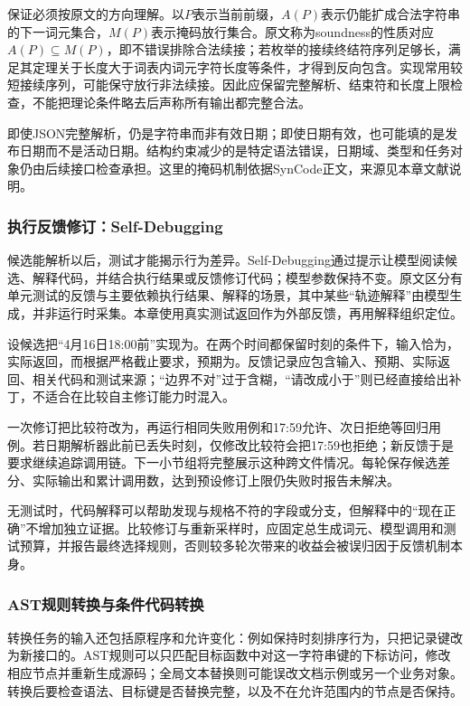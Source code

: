保证必须按原文的方向理解。以$P$表示当前前缀，$A(P)$表示仍能扩成合法字符串的下一词元集合，$M(P)$表示掩码放行集合。原文称为soundness的性质对应$A(P)\subseteq M(P)$，即不错误排除合法续接；若枚举的接续终结符序列足够长，满足其定理关于长度大于词表内词元字符长度等条件，才得到反向包含。实现常用较短接续序列，可能保守放行非法续接。因此应保留完整解析、结束符和长度上限检查，不能把理论条件略去后声称所有输出都完整合法。

即使JSON完整解析，仍是字符串而非有效日期；即使日期有效，也可能填的是发布日期而不是活动日期。结构约束减少的是特定语法错误，日期域、类型和任务对象仍由后续接口检查承担。这里的掩码机制依据SynCode正文，来源见本章文献说明。

\subsubsection{执行反馈修订：Self-Debugging}
\label{sec:nlp-execution-self-debugging}

候选能解析以后，测试才能揭示行为差异。Self-Debugging通过提示让模型阅读候选、解释代码，并结合执行结果或反馈修订代码；模型参数保持不变。原文区分有单元测试的反馈与主要依赖执行结果、解释的场景，其中某些“轨迹解释”由模型生成，并非运行时采集。本章使用真实测试返回作为外部反馈，再用解释组织定位。

设候选把“4月16日18:00前”实现为。在两个时间都保留时刻的条件下，输入恰为，实际返回，而根据严格截止要求，预期为。反馈记录应包含输入、预期、实际返回、相关代码和测试来源；“边界不对”过于含糊，“请改成小于”则已经直接给出补丁，不适合在比较自主修订能力时混入。

一次修订把比较符改为\code{<}，再运行相同失败用例和17:59允许、次日拒绝等回归用例。若日期解析器此前已丢失时刻，仅修改比较符会把17:59也拒绝；新反馈于是要求继续追踪调用链。下一小节组将完整展示这种跨文件情况。每轮保存候选差分、实际输出和累计调用数，达到预设修订上限仍失败时报告未解决。

无测试时，代码解释可以帮助发现与规格不符的字段或分支，但解释中的“现在正确”不增加独立证据。比较修订与重新采样时，应固定总生成词元、模型调用和测试预算，并报告最终选择规则，否则较多轮次带来的收益会被误归因于反馈机制本身。

\subsubsection{AST规则转换与条件代码转换}
\label{sec:nlp-execution-transformation}

转换任务的输入还包括原程序和允许变化：例如保持时刻排序行为，只把记录键改为新接口的。AST规则可以只匹配目标函数中对这一字符串键的下标访问，修改相应节点并重新生成源码；全局文本替换则可能误改文档示例或另一个业务对象。转换后要检查语法、目标键是否替换完整，以及不在允许范围内的节点是否保持。

